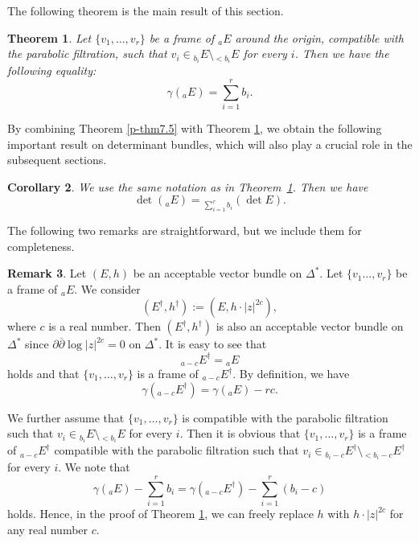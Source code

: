 \documentclass[12pt,twoside]{amsart}
\newtheorem{thm}{Theorem}[section]
\newtheorem{cor}[thm]{Corollary}
\theoremstyle{definition}
\newtheorem{rem}[thm]{Remark}
\begin{document}
The following theorem is the main result of this section.

\begin{thm}\label{p-thm12.3}
Let $\{v_1, \dots, v_r\}$ be a frame of ${}_aE$ 
around the origin, compatible with the parabolic 
filtration, such that $v_i \in {}_{b_i}E \setminus {}_{< b_i}E$ 
for every $i$.  
Then we have the following equality:
\[
\gamma({}_a E) = \sum_{i=1}^r b_i.
\]
\end{thm}

By combining Theorem \ref{p-thm7.5} with Theorem \ref{p-thm12.3}, 
we obtain the following important result on 
determinant bundles, which will also play a crucial role in the subsequent sections.

\begin{cor}\label{p-cor12.4}
We use the same notation as in Theorem~\ref{p-thm12.3}.  
Then we have
\[
\det({}_aE) = {}_{\sum_{i=1}^r b_i} \left( \det E \right).
\]
\end{cor}

The following two remarks are 
straightforward, but we include them for completeness.

\begin{rem}\label{p-rem12.5}
Let $(E, h)$ be an acceptable vector bundle 
on $\Delta^*$. 
Let $\{v_1\ldots, v_r\}$ be a frame of ${}_a E$. 
We consider 
\[
(E^\dag, h^\dag):=(E, h\cdot |z|^{2c}), 
\] 
where $c$ is a real number. 
Then $(E^\dag, h^\dag)$ is also an acceptable vector bundle 
on $\Delta^*$ since $\partial \overline \partial \log |z|^{2c}=0$ on 
$\Delta^*$. 
It is easy to see that 
\[ 
{}_{a-c} E^\dag ={}_a E
\] 
holds and that $\{v_1, \ldots, v_r\}$ is a frame of ${}_{a-c} E^\dag$. 
By definition, we have 
\[
\gamma ({}_{a-c} E^\dag)=\gamma ({}_a E)-rc. 
\] 

We further assume that 
$\{v_1, \ldots, v_r\}$ is compatible with the parabolic filtration 
such that $v_i\in {}_{b_i} E\setminus {}_{<b_i}E$ for every $i$. 
Then it is obvious that $\{v_1, \ldots, v_r\}$ is a frame 
of ${}_{a-c} E^\dag$ compatible with the parabolic filtration such that 
$v_i \in {}_{b_i-c} E^\dag \setminus {}_{<b_i-c} E^\dag$ for every $i$. 
We note that 
\[
\gamma ({}_a E)-\sum _{i=1}^r b_i =\gamma ({}_{a-c} E^\dag) -\sum 
_{i=1}^r (b_i-c) 
\] 
holds. 
Hence, in the proof of Theorem \ref{p-thm12.3}, we can freely replace 
$h$ with $h\cdot |z|^{2c}$ for any real number $c$. 
\end{rem}
\end{document}
